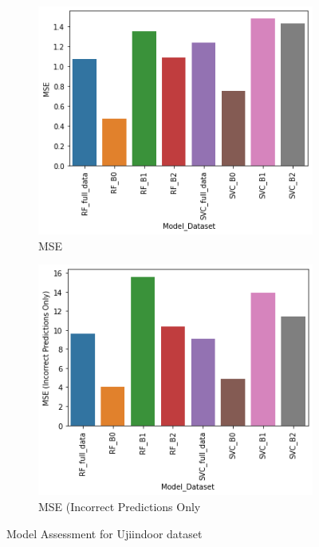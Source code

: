 \documentclass[a4paper,singleside,12pt]{report} %
\begin{document}
\begin{figure}[!htb]
			  \begin{subfigure}[b]{0.48\linewidth}
			    \includegraphics[width=\linewidth]{./figures/MSEfinal_results.png}
			    \caption{MSE}
			  \end{subfigure}
			  \begin{subfigure}[b]{0.48\linewidth}
			    \includegraphics[width=\linewidth]{./figures/MSE (Incorrect Predictions Only)final_results.png}
			    \caption{MSE (Incorrect Predictions Only}
			  \end{subfigure}
			  \caption{Model Assessment for Ujiindoor dataset}
			  \label{fig5.7}
			\end{figure} 
			
\end{document}
